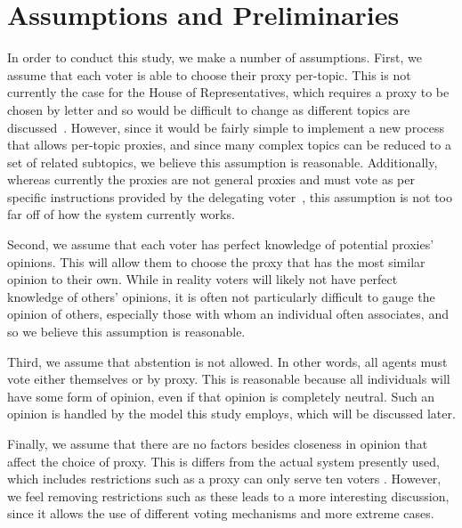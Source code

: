 \section{Assumptions and Preliminaries}\label{sec:assumptions-and-preliminaries}
In order to conduct this study, we make a number of assumptions.
First, we assume that each voter is able to choose their proxy per-topic.
This is not currently the case for the House of Representatives, which requires
a proxy to be chosen by letter and so would be difficult to change as different
topics are discussed~\cite{Congress.gov2020}.
However, since it would be fairly simple to implement a new process that allows
per-topic proxies, and since many complex topics can be reduced to a set of related
subtopics, we believe this assumption is reasonable.
Additionally, whereas currently the proxies are not general proxies and must vote as
per specific instructions provided by the delegating
voter~\cite{CERP2020, Congress.gov2020}, this assumption is not too far off of how
the system currently works.

Second, we assume that each voter has perfect knowledge of potential proxies' opinions. 
This will allow them to choose the proxy that has the most similar opinion to their own.
While in reality voters will likely not have perfect knowledge of others' opinions,
it is often not particularly difficult to gauge the opinion of others, especially
those with whom an individual often associates, and so we believe this assumption is
reasonable.

Third, we assume that abstention is not allowed.
In other words, all agents must vote either themselves or by proxy.
This is reasonable because all individuals will have some form of opinion, even if
that opinion is completely neutral.
Such an opinion is handled by the model this study employs, which will be discussed
later.

Finally, we assume that there are no factors besides closeness in opinion that affect
the choice of proxy.
This is differs  from the actual system presently used, which includes restrictions
such as a proxy can only serve ten voters \cite{CERP2020}.
However, we feel removing restrictions such as these leads to a more interesting
discussion, since it allows the use of different voting mechanisms and more extreme
cases.

